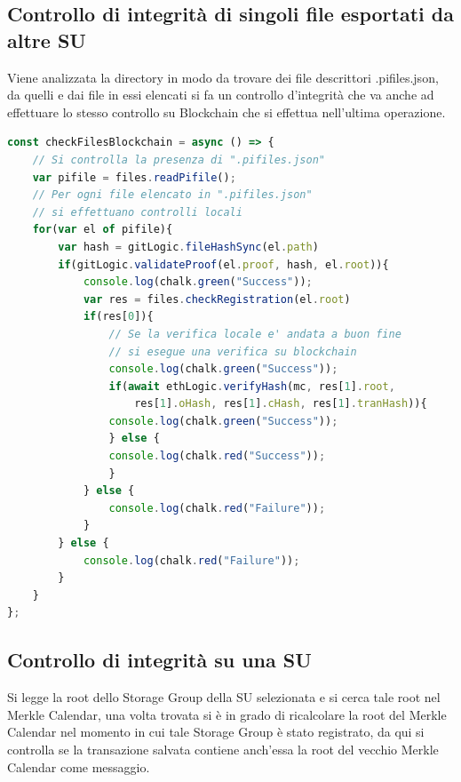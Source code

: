 \subsection{Controllo di integrità di singoli file esportati da altre SU}
Viene analizzata la directory in modo da trovare dei file descrittori \textsf{.pifiles.json}, da quelli e dai file in essi elencati si fa un controllo d'integrità che va anche ad effettuare lo stesso controllo su Blockchain che si effettua nell'ultima operazione.
\newpage
\begin{lstlisting}[language=JavaScript]
const checkFilesBlockchain = async () => {
    // Si controlla la presenza di ".pifiles.json"
    var pifile = files.readPifile();
    // Per ogni file elencato in ".pifiles.json"
    // si effettuano controlli locali
    for(var el of pifile){
        var hash = gitLogic.fileHashSync(el.path)
        if(gitLogic.validateProof(el.proof, hash, el.root)){
            console.log(chalk.green("Success"));
            var res = files.checkRegistration(el.root)
            if(res[0]){
                // Se la verifica locale e' andata a buon fine
                // si esegue una verifica su blockchain
                console.log(chalk.green("Success"));
                if(await ethLogic.verifyHash(mc, res[1].root,
                    res[1].oHash, res[1].cHash, res[1].tranHash)){
                console.log(chalk.green("Success"));
                } else {
                console.log(chalk.red("Success"));
                }
            } else {
                console.log(chalk.red("Failure"));
            }
        } else {
            console.log(chalk.red("Failure"));
        }
    }
};
\end{lstlisting}

\subsection{Controllo di integrità su una SU}
Si legge la root dello Storage Group della SU selezionata e si cerca tale root nel Merkle Calendar, una volta trovata si è in grado di ricalcolare la root del Merkle Calendar nel momento in cui tale Storage Group è stato registrato, da qui si controlla se la transazione salvata contiene anch'essa la root del vecchio Merkle Calendar come messaggio.

\newpage

